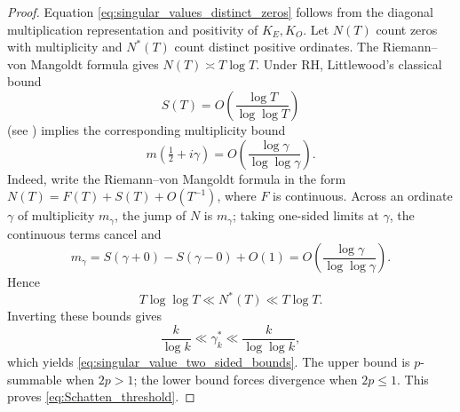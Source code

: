 \documentclass[preprint,12pt]{elsarticle}
\numberwithin{equation}{section}
\theoremstyle{plain}
\theoremstyle{definition}
\theoremstyle{remark}
\newcommand{\RH}{\mathrm{RH}}
\begin{document}
\begin{proof}
Equation \eqref{eq:singular_values_distinct_zeros} follows from the diagonal multiplication representation and positivity of $K_E,K_O$.  Let $N(T)$ count zeros with multiplicity and $N^*(T)$ count distinct positive ordinates.  The Riemann--von Mangoldt formula gives $N(T)\asymp T\log T$.  Under $\RH$, Littlewood's classical bound
\begin{equation}
S(T)=O\!\left(\frac{\log T}{\log\log T}\right)
\label{eq:Littlewood_S_bound}
\end{equation}
(see \cite[Chapter XIV]{Titchmarsh1986}) implies the corresponding multiplicity bound
\begin{equation}
m(\tfrac12+i\gamma)
=O\!\left(\frac{\log\gamma}{\log\log\gamma}\right).
\label{eq:RH_multiplicity_bound}
\end{equation}
Indeed, write the Riemann--von Mangoldt formula in the form
\(N(T)=F(T)+S(T)+O(T^{-1})\), where \(F\) is continuous.  Across an ordinate
\(\gamma\) of multiplicity \(m_\gamma\), the jump of \(N\) is \(m_\gamma\); taking
one-sided limits at \(\gamma\), the continuous terms cancel and
\[
m_\gamma
=S(\gamma+0)-S(\gamma-0)+O(1)
=O\!\left(\frac{\log\gamma}{\log\log\gamma}\right).
\]
Hence
\begin{equation}
T\log\log T\ll N^*(T)\ll T\log T.
\label{eq:distinct_zero_count_bounds}
\end{equation}
Inverting these bounds gives
\begin{equation}
\frac{k}{\log k}\ll\gamma_k^*\ll\frac{k}{\log\log k},
\label{eq:distinct_ordinate_bounds}
\end{equation}
which yields \eqref{eq:singular_value_two_sided_bounds}.  The upper bound is $p$-summable when $2p>1$; the lower bound forces divergence when $2p\le1$.  This proves \eqref{eq:Schatten_threshold}.
\end{proof}
\end{document}
